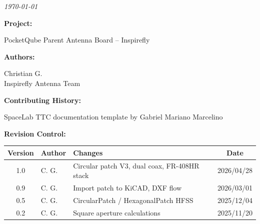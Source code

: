 %
%
%
%
%

%
%
%
%
%

\thispagestyle{empty}

\begin{center}

\textbf{\thetitle}

\textit{\today}

\vspace{1cm}

\textbf{Project:}

PocketQube Parent Antenna Board -- Inspirefly

\vspace{1cm}

\textbf{Authors:}

Christian G. \\
Inspirefly Antenna Team \\

\vspace{1cm}

\textbf{Contributing History:}

SpaceLab TTC documentation template by Gabriel Mariano Marcelino \\

\vspace{1cm}

\textbf{Revision Control:}

\end{center}

\begin{table}[!ht]
    \begin{center}
        \begin{tabular}{c l p{5cm} c}
            \toprule[1.5pt]
            \textbf{Version} & \textbf{Author}  & \textbf{Changes}    & \textbf{Date} \\
            \midrule
            1.0     & C. G.                     & Circular patch V3, dual coax, FR-408HR stack & 2026/04/28 \\
            0.9     & C. G.                     & Import patch to KiCAD, DXF flow & 2026/03/01 \\
            0.5     & C. G.                     & CircularPatch / HexagonalPatch HFSS & 2025/12/04 \\
            0.2     & C. G.                     & Square aperture calculations & 2025/11/20 \\
            \bottomrule[1.5pt]
        \end{tabular}
    \end{center}
\end{table}

